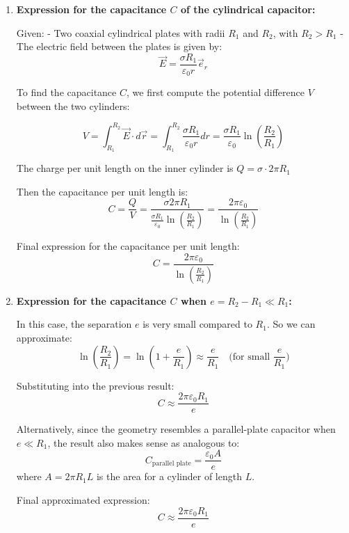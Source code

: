 \documentclass[12pt]{article}
\begin{document}
\newpage

\begin{answerbox}
    \begin{enumerate}
        \item \textbf{Expression for the capacitance $ C $ of the cylindrical capacitor:}
    
        Given:
        - Two coaxial cylindrical plates with radii $ R_1 $ and $ R_2 $, with $ R_2 > R_1 $
        - The electric field between the plates is given by:
        $$
        \vec{E} = \frac{\sigma R_1}{\varepsilon_0 r} \vec{e}_r
        $$
    
        To find the capacitance $ C $, we first compute the potential difference $ V $ between the two cylinders:
    
        $$
        V = \int_{R_1}^{R_2} \vec{E} \cdot d\vec{r} = \int_{R_1}^{R_2} \frac{\sigma R_1}{\varepsilon_0 r} dr
        = \frac{\sigma R_1}{\varepsilon_0} \ln\left( \frac{R_2}{R_1} \right)
        $$
    
        The charge per unit length on the inner cylinder is $ Q = \sigma \cdot 2\pi R_1 $
    
        Then the capacitance per unit length is:
        $$
        C = \frac{Q}{V} = \frac{\sigma 2\pi R_1}{\frac{\sigma R_1}{\varepsilon_0} \ln\left( \frac{R_2}{R_1} \right)} = \frac{2\pi\varepsilon_0}{\ln\left( \frac{R_2}{R_1} \right)}
        $$
    
        Final expression for the capacitance per unit length:
        $$
        \boxed{C = \frac{2\pi\varepsilon_0}{\ln\left( \frac{R_2}{R_1} \right)}}
        $$
    
        \item \textbf{Expression for the capacitance $ C $ when $ e = R_2 - R_1 \ll R_1 $:}
    
        In this case, the separation $ e $ is very small compared to $ R_1 $. So we can approximate:
        $$
        \ln\left( \frac{R_2}{R_1} \right) = \ln\left( 1 + \frac{e}{R_1} \right) \approx \frac{e}{R_1} \quad \text{(for small } \frac{e}{R_1})
        $$
    
        Substituting into the previous result:
        $$
        C \approx \frac{2\pi\varepsilon_0 R_1}{e}
        $$
    
        Alternatively, since the geometry resembles a parallel-plate capacitor when $ e \ll R_1 $, the result also makes sense as analogous to:
        $$
        C_{\text{parallel plate}} = \frac{\varepsilon_0 A}{e}
        $$
        where $ A = 2\pi R_1 L $ is the area for a cylinder of length $ L $.
    
        Final approximated expression:
        $$
        \boxed{C \approx \frac{2\pi\varepsilon_0 R_1}{e}}
        $$
    \end{enumerate}
\end{answerbox}

\end{document}

